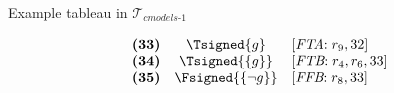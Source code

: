 \begin{frame}{Example tableau in $\mathcal{T}_{\textit{cmodels{-}1}}$}
\begin{center}
\begin{minipage}[t]{16cm}
\begin{minipage}[t]{6cm}
\begin{minipage}[t]{2cm}
\[\begin{array}{lcl}
\textbf{(33)}                                      &
  \Tsigned{g}                                      &
  [\textit{FTA}{:}\;r_9, \text{32}]                \\
\textbf{(34)}                                      &
  \Tsigned{\{g\}}                                  &
  [\textit{FTB}{:}\;r_4, r_6, \text{33}]           \\
\textbf{(35)}                                      &
  \Fsigned{\{\neg g\}}                     &
  [\textit{FFB}{:}\;r_8, \text{33}]
\end{array}
\]
\end{minipage}
\end{minipage}
\end{minipage}
\end{center}
\end{frame}

